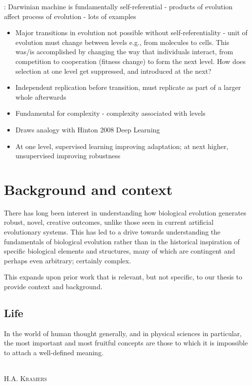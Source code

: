 \begin{NOTES}
\autocite{Watson2015}:
Darwinian machine is fundamentally self-referential - products of evolution affect process of evolution - lots of examples
\begin{itemize}
\item Major transitions in evolution not possible without self-referentiality - unit of evolution must change between levels e.g., from molecules to cells. This was/is accomplished by changing the way that individuals interact, from competition to cooperation (fitness change) to form the next level. How does selection at one level get suppressed, and introduced at the next?
\item Independent replication before transition, must replicate as part of a larger whole afterwards
\item Fundamental for complexity - complexity associated with levels
\item Draws analogy with Hinton 2008 Deep Learning
\item At one level, supervised learning improving adaptation; at next higher, unsupervised improving robustness
\end{itemize}
\end{NOTES}

\section{Background and context}\label{background-and-context}

There has long been interest in understanding how biological evolution generates robust, novel, creative outcomes, unlike those seen in current artificial evolutionary systems. This has led to a drive towards understanding the fundamentals of biological evolution rather than in the historical inspiration of specific biological elements and structures, many of which are contingent and perhaps even arbitrary; certainly complex.
	
This  expands upon prior work that is relevant, but not specific, to our thesis to provide context and background.

\subsection{Life}\label{life}

\epigraph{%
In the world of human thought generally, and in physical sciences in particular, the most important and most fruitful concepts are those to which it is impossible to attach a well-defined meaning.}%
{\textsc{\\H.A. Kramers}}

